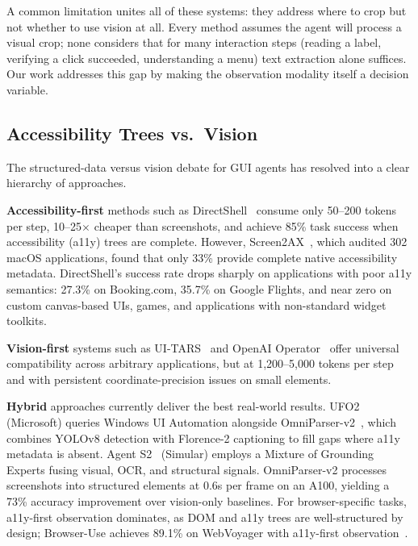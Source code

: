 \documentclass[11pt,a4paper]{article}
\begin{document}
A common limitation unites all of these systems: they address where to crop but not whether to use vision at all. Every method assumes the agent will process a visual crop; none considers that for many interaction steps (reading a label, verifying a click succeeded, understanding a menu) text extraction alone suffices. Our work addresses this gap by making the observation modality itself a decision variable.

\subsection{Accessibility Trees vs.\ Vision}
\label{sec:rw-a11y-vs-vision}

The structured-data versus vision debate for GUI agents has resolved into a clear hierarchy of approaches.

\textbf{Accessibility-first} methods such as DirectShell~\cite{directshell} consume only 50--200 tokens per step, 10--25$\times$ cheaper than screenshots, and achieve 85\% task success when accessibility (a11y) trees are complete. However, Screen2AX~\cite{screen2ax}, which audited 302 macOS applications, found that only 33\% provide complete native accessibility metadata. DirectShell's success rate drops sharply on applications with poor a11y semantics: 27.3\% on Booking.com, 35.7\% on Google Flights, and near zero on custom canvas-based UIs, games, and applications with non-standard widget toolkits.

\textbf{Vision-first} systems such as UI-TARS~\cite{ui-tars} and OpenAI Operator~\cite{openai-operator} offer universal compatibility across arbitrary applications, but at 1{,}200--5{,}000 tokens per step and with persistent coordinate-precision issues on small elements.

\textbf{Hybrid} approaches currently deliver the best real-world results. UFO2~\cite{ufo2} (Microsoft) queries Windows UI Automation alongside OmniParser-v2~\cite{omniparser}, which combines YOLOv8 detection with Florence-2 captioning to fill gaps where a11y metadata is absent. Agent S2~\cite{agent-s2} (Simular) employs a Mixture of Grounding Experts fusing visual, OCR, and structural signals. OmniParser-v2 processes screenshots into structured elements at 0.6s per frame on an A100, yielding a 73\% accuracy improvement over vision-only baselines. For browser-specific tasks, a11y-first observation dominates, as DOM and a11y trees are well-structured by design; Browser-Use achieves 89.1\% on WebVoyager with a11y-first observation~\cite{browser-use}.
\end{document}
